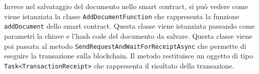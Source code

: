 Invece nel salvataggio del documento nello smart contract, si può vedere come
viene istanziata la classe \texttt{AddDocumentFunction} che rappresenta la
funzione \texttt{addDocument} dello smart contract. Questa classe viene
istanziata passando come parametri la chiave e l'hash code del documento da
salvare. Questa classe viene poi passata al metodo
\texttt{SendRequestAndWaitForReceiptAsync} che permette di eseguire la
transazione sulla blockchain. Il metodo restituisce un oggetto di tipo
\texttt{Task<TransactionReceipt>} che rappresenta il risultato della
transazione.
